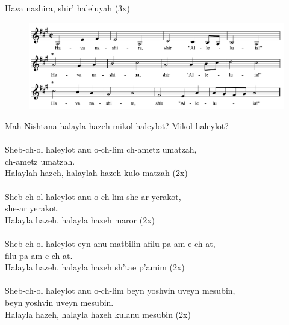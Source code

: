 \documentclass[twoside,14pt,openany,letterpaper]{memoir}%
\begin{document}

Hava nashira, shir’ haleluyah (3x)

\begin{figure}[h]
\vspace{3.0cm}
\includegraphics[scale=0.69]{havaNashira}
\centering
\end{figure}


Mah Nishtana halayla hazeh mikol haleylot? Mikol haleylot?\\
\\
Sheb-ch-ol haleylot anu o-ch-lim ch-ametz umatzah,\\
ch-ametz umatzah.\\
Halaylah hazeh, halaylah hazeh kulo matzah (2x)\\
\\
Sheb-ch-ol haleylot anu o-ch-lim she-ar yerakot,\\
she-ar yerakot.\\
Halayla hazeh, halayla hazeh maror (2x)\\
\\
Sheb-ch-ol haleylot eyn anu matbilin afilu pa-am e-ch-at,\\
filu pa-am e-ch-at.\\
Halayla hazeh, halayla hazeh sh’tae p’amim (2x)\\
\\
Sheb-ch-ol haleylot anu o-ch-lim beyn yoshvin uveyn mesubin,\\
beyn yoshvin uveyn mesubin.\\
Halayla hazeh, halayla hazeh kulanu mesubin (2x)\\
\end{document}
